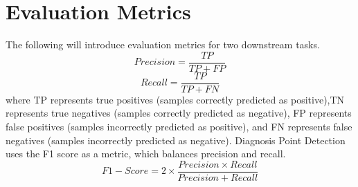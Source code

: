 



\section{Evaluation Metrics}
\label{sec:appendixC}
The following will introduce evaluation metrics for two downstream tasks. $$Precision=\frac{TP}{TP+FP}$$ $$Recall=\frac{TP}{TP+FN}$$
where TP represents true positives (samples correctly predicted as positive),TN represents true negatives (samples correctly predicted as negative), FP represents false positives (samples incorrectly predicted as positive), and FN represents false negatives (samples incorrectly predicted as negative).
Diagnosis Point Detection uses the F1 score as a metric, which balances precision and recall.
$$F1-Score = 2\times\frac{Precision \times Recall}{Precision + Recall}$$

